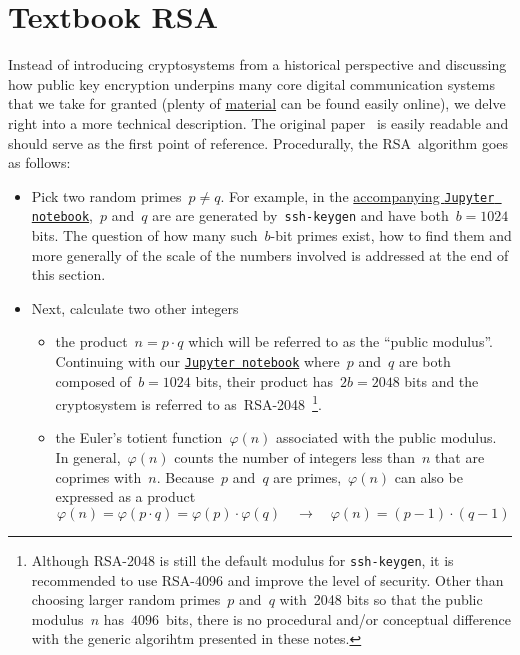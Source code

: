 \documentclass{article}
\begin{document}
\vspace{0.2cm}

\section{Textbook RSA}
\label{sec::algo}

Instead of introducing cryptosystems from a historical perspective and discussing how public key encryption underpins many core digital communication systems that we take for granted (plenty of \href{https://en.wikipedia.org/wiki/RSA_(cryptosystem)}{material} can be found easily online), we delve right into a more technical description.  The original paper~\cite{rsaOriginal} is easily readable and should serve as the first point of reference.  Procedurally, the RSA~algorithm goes as follows:
\begin{itemize}
\item Pick two random primes~$p \neq q$.  For example, in the \href{https://github.com/Ranlot/public-key-encryption}{accompanying \texttt{Jupyter notebook}},~$p$ and~$q$ are are generated by~\texttt{ssh-keygen} and have both~$b=1024$ bits.  The question of how many such~$b$-bit primes exist, how to find them and more generally of the scale of the numbers involved is addressed at the end of this section.
\item Next, calculate two other integers
\begin{itemize}
    \item the product~$n=p \cdot q$ which will be referred to as the ``public modulus''.  Continuing with our \href{https://github.com/Ranlot/public-key-encryption}{\texttt{Jupyter notebook}} where~$p$ and~$q$ are both composed of~$b=1024$ bits, their product has~$2b = 2048$ bits and the cryptosystem is referred to as~RSA-2048~\footnote{Although RSA-2048 is still the default modulus for \texttt{ssh-keygen}, it is recommended to use RSA-4096 and improve the level of security.  Other than choosing larger random primes~$p$ and~$q$ with~2048 bits so that the public modulus~$n$ has~$4096$~bits, there is no procedural and/or conceptual difference with the generic algorihtm presented in these notes.}.  
    \item the Euler's totient function~$\varphi(n)$ associated with the public modulus.  In general,~$\varphi(n)$ counts the number of integers less than~$n$ that are coprimes with~$n$.  Because~$p$ and~$q$ are primes,~$\varphi(n)$ can also be expressed as a product
    \begin{equation}
        \varphi(n) = \varphi(p\cdot q) = \varphi(p) \cdot \varphi(q) \quad \rightarrow \quad \varphi(n) = (p-1) \cdot (q-1)

\end{equation}
\end{itemize}
\end{itemize}
\end{document}
